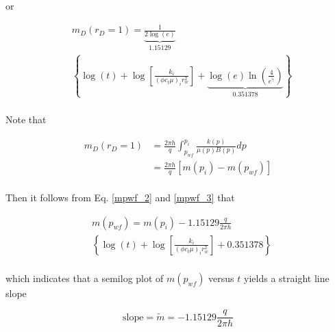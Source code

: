 \documentclass{llncs}
\numberwithin{equation}{section}
\numberwithin{figure}{section}
\numberwithin{table}{section}
\begin{document}
    or
    
    \begin{equation}
       \begin{split}
        & {{m}_{D}}\left( {{r}_{D}}=1 \right)=\underbrace{\frac{1}{2\log \left( e \right)}}_{\text{1}\text{.15129}} \\
    & \left\{ \log \left( t \right)+\log \left[ \frac{{{k}_{i}}}{{{\left( \phi {{c}_{t}}\mu  \right)}_{i}}r_{w}^{2}} \right]+\underbrace{\log \left( e \right)\ln \left( \frac{4}{{{e}^{\widetilde{\gamma }}}} \right)}_{\text{0}\text{.351378}} \right\} \\
    \end{split}
        \label{mpwf_2}
    \end{equation}    
    
    Note that
    
    \begin{equation}
     \begin{split}
     {{m}_{D}}\left( {{r}_{D}}=1 \right)&=\frac{2\pi h}{q}\int_{{{p}_{wf}}}^{{{p}_{i}}}{\frac{k\left( p \right)}{\mu \left( p \right)B\left( p \right)}}dp \\
     & =\frac{2\pi h}{q}\left[ m\left( {{p}_{i}} \right)-m\left( {{p}_{wf}} \right) \right] \\
    \end{split}
        \label{mpwf_3}
    \end{equation}      
    
    Then it follows from Eq. \ref{mpwf_2} and \ref{mpwf_3} that
    
    \begin{equation}
    \begin{split}
    & m\left( {{p}_{wf}} \right)=m\left( {{p}_{i}} \right)-\text{1}\text{.15129}\frac{q}{2\pi h} \\
    & \left\{ \log \left( t \right)+\log \left[ \frac{{{k}_{i}}}{{{\left( \phi {{c}_{t}}\mu  \right)}_{i}}r_{w}^{2}} \right]+\text{0}\text{.351378} \right\} \\
    \end{split}
        \label{mpwf_4}
    \end{equation}
        
    which indicates that a semilog plot of $m(p_{wf})$ versus $t$  yields a straight line  slope
    
    \begin{equation}
        \text{slope}=\widetilde{m}=-\text{1}\text{.15129}\frac{q}{2\pi h}
        \label{semilog_slope}
    \end{equation}    
    
\end{document}
